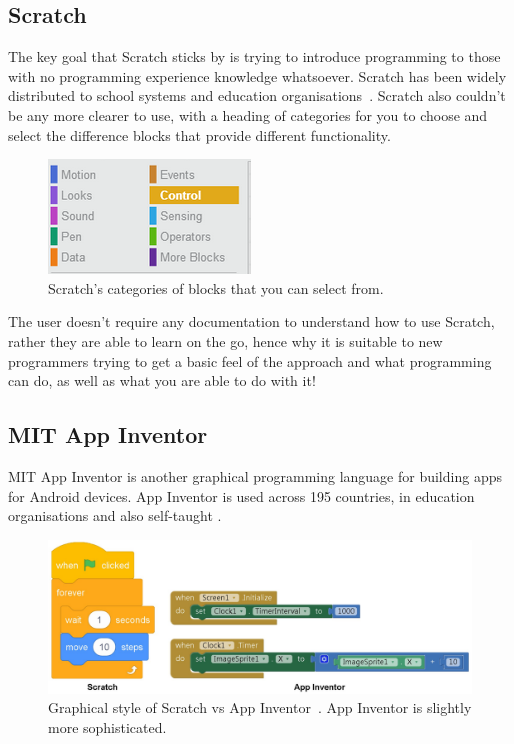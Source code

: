 \documentclass[a4paper, 12pt]{article}
\begin{document}
        \subsection{Scratch}
            The key goal that Scratch sticks by is trying to introduce programming to those with no
            programming experience knowledge whatsoever. Scratch has been widely distributed to school
            systems and education organisations~\cite{maloney2010scratch}. Scratch also couldn't be any
            more clearer to use, with a heading of categories for you to choose and select the difference
            blocks that provide different functionality.

            \begin{figure}[h]
                \centering
                \includegraphics{scratch_blocks.png}
                \caption{Scratch's categories of blocks that you can select from.}
            \end{figure}

            The user doesn't require any documentation to understand how to use Scratch, rather they
            are able to learn on the go, hence why it is suitable to new programmers trying to get a
            basic feel of the approach and what programming can do, as well as what you are able to
            do with it!

        \subsection{MIT App Inventor}
            MIT App Inventor is another graphical programming language for building apps for Android devices.
            App Inventor is used across 195 countries, in education organisations and also self-taught
            \cite{xie2016skill}. 

            \begin{figure}[h]
                \centering
                \includegraphics[width=125mm]{scratch_vs_appinventor.png}
                \caption{Graphical style of Scratch vs App Inventor~\cite{park2019comparing}. App Inventor is slightly more sophisticated.}
            \end{figure}
\end{document}
